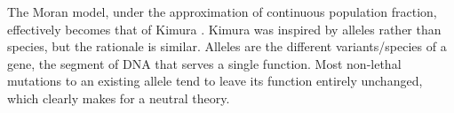 The Moran model, under the approximation of continuous population fraction, effectively becomes that of Kimura \cite{Kimura1955,Kimura1983}.
Kimura was inspired by alleles rather than species, but the rationale is similar. %
Alleles are the different variants/species of a gene, the segment of DNA that serves a single function. 
Most non-lethal mutations to an existing allele tend to leave its function entirely unchanged, which clearly makes for a neutral theory. 
